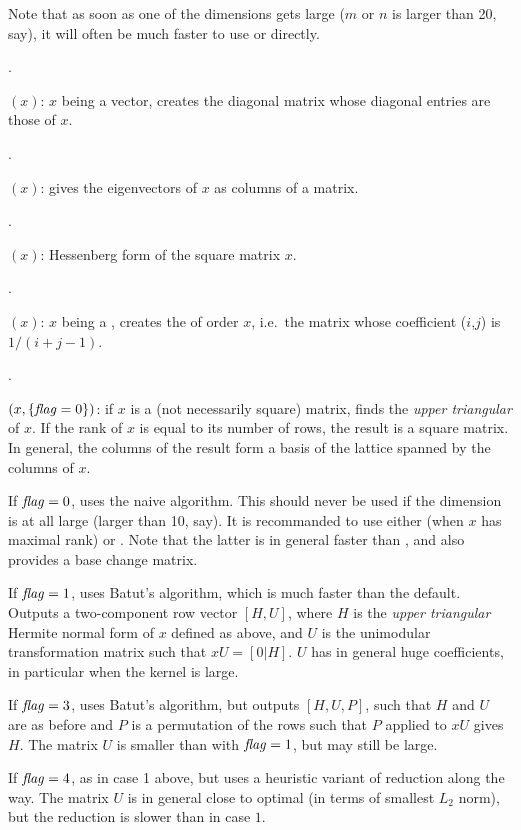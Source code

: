 Note that as soon as one of the dimensions gets large ($m$ or $n$ is larger
than 20, say), it will often be much faster to use  or
 directly.

.

$(x)$: $x$ being a vector, creates the diagonal matrix
whose diagonal entries are those of $x$.

.

$(x)$: gives the eigenvectors of $x$ as columns of a
matrix.

.

$(x)$: Hessenberg form of the square matrix $x$.

.

$(x)$: $x$ being a , creates the  of order $x$, i.e.~the matrix whose coefficient ($i$,$j$) is $1/
(i+j-1)$.

.

$(x,\{\hbox{\it f\kern0pt lag\/}=0\})$: if $x$ is a (not necessarily square)
matrix, finds the \emph{upper triangular}  of $x$. If
the rank of $x$ is equal to its number of rows, the result is a square
matrix. In general, the columns of the result form a basis of the lattice
spanned by the columns of $x$.

If $\hbox{\it f\kern0pt lag\/}=0$, uses the naive algorithm. This should never be used if the
dimension is at all large (larger than 10, say). It is recommanded to use
either  (when $x$ has maximal rank) or
. Note that the latter is in general faster than
, and also provides a base change matrix.

If $\hbox{\it f\kern0pt lag\/}=1$, uses Batut's algorithm, which is much faster than the default.
Outputs a two-component row vector $[H,U]$, where $H$ is the \emph{upper
triangular} Hermite normal form of $x$ defined as above,  and $U$ is the
unimodular transformation matrix such that $xU=[0|H]$. $U$ has in general
huge coefficients, in particular when the kernel is large.

If $\hbox{\it f\kern0pt lag\/}=3$, uses Batut's algorithm, but outputs $[H,U,P]$, such that $H$ and
$U$ are as before and $P$ is a permutation of the rows such that $P$ applied
to $xU$ gives $H$. The matrix $U$ is smaller than with $\hbox{\it f\kern0pt lag\/}=1$, but may still
be large.

If $\hbox{\it f\kern0pt lag\/}=4$, as in case 1 above, but uses a heuristic variant of 
reduction along the way. The matrix $U$ is in general close to optimal (in
terms of smallest $L_2$ norm), but the reduction is slower than in case $1$.

